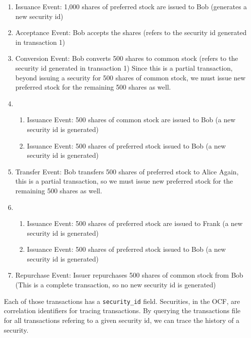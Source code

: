 \begin{enumerate}\label{list:transactions}
	\item Issuance Event: 1,000 shares of preferred stock are issued to Bob (generates a new security id)
	\item Acceptance Event: Bob accepts the shares (refers to the security id generated in transaction 1)
	\item Conversion Event: Bob converts 500 shares to common stock (refers to the security id generated in transaction 1)
	      \subitem Since this is a partial transaction, beyond issuing a security for 500 shares of common stock, we must issue new preferred stock for the remaining 500 shares as well.
	\item \begin{enumerate}
	\item Issuance Event: 500 shares of common stock are issued to Bob (a new security id is generated)
	\item Issuance Event: 500 shares of preferred stock issued to Bob (a new security id is generated)
\end{enumerate}
\item Transfer Event: Bob transfers 500 shares of preferred stock to Alice
\subitem Again, this is a partial transaction, so we must issue new preferred stock for the remaining 500 shares as well.
\item \begin{enumerate}
\item Issuance Event: 500 shares of preferred stock are issued to Frank (a new security id is generated)
\item Issuance Event: 500 shares of preferred stock issued to Bob (a new security id is generated)
\end{enumerate}
\item Repurchase Event: Issuer repurchases 500 shares of common stock from Bob (This is a complete transaction, so no new security id is generated)
\end{enumerate}

Each of those transactions has a \verb|security_id| field. Securities, in the OCF, are correlation identifiers for tracing transactions. By querying the transactions file for all transactions refering to a given security id, we can trace the history of a security.


